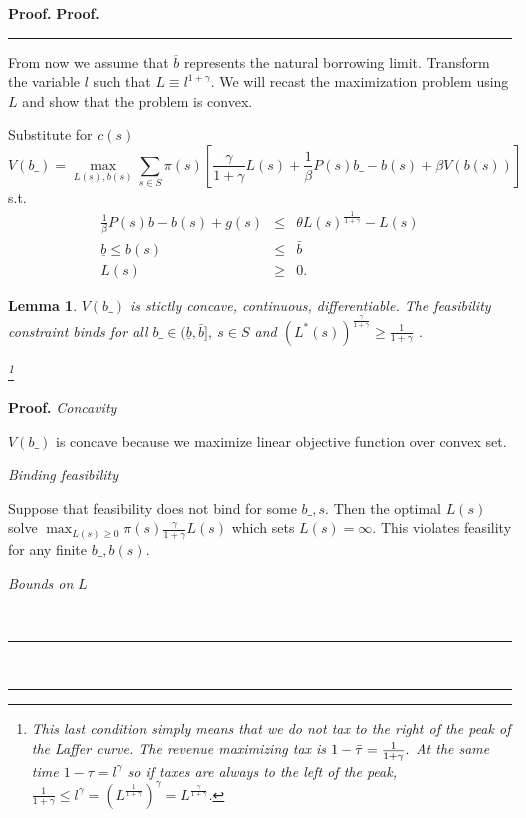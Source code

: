 \documentclass[thmsb,11pt]{article}
\newtheorem{lemma}{Lemma}
\newenvironment{proof}[1][Proof]{\noindent \textbf{#1.} }{\  \rule{0.5em}{0.5em}}
\begin{document}
\begin{proof}
\begin{proof}
\end{proof}

From now we assume that $\overline{b}$ represents the natural borrowing limit. Transform the variable $l$ such that $L\equiv l^{1+\gamma }$. We will recast the maximization problem using $L$ and show that the problem is convex.

Substitute for $c\left( s\right) $%
\[
V\left( b\_\right) =\max_{L(s),b(s)}\sum_{s\in S}\pi \left(
s\right) \left[ \frac{\gamma}{1+\gamma }L\left( s\right) +\frac{1}{\beta }%
P\left( s\right) b\_-b\left( s\right) +\beta V\left( b\left( s\right)
\right) \right]
\]%
s.t.%
\begin{eqnarray*}
\frac{1}{\beta }P\left( s\right) b-b\left( s\right) +g\left( s\right) &\leq
&\theta L\left( s\right)^{\frac{1}{1+\gamma} } -L\left( s\right) \\
\underline{b}\leq b\left( s\right) &\leq &\bar{b} \\
L\left( s\right) &\geq &0.
\end{eqnarray*}

\begin{lemma}
\smallskip $V\left( b\_\right) $ is stictly concave, continuous,
differentiable. The feasibility constraint binds for all $b\_\in (\underline{b} ,\bar{b}%
],\ s\in S$ and $\left( L^{\ast }\left( s\right) \right) ^{\frac{\gamma}{1+\gamma} }\geq\frac{1}{1+\gamma}$ .

\footnote{
This last condition simply means that we do not tax to the right of the peak
of the Laffer curve. The revenue maximizing tax is $1-\bar{\tau}=\frac{1}{%
1+\gamma }.$ At the same time $1-\tau =l^{\gamma}$ so if taxes are always
to the left of the peak, $\frac{1}{1+\gamma }\leq l^{\gamma }=\left(
L^{\frac{1}{1+\gamma} }\right)^{\gamma}=L^{\frac{\gamma}{1+\gamma} }$.}
\end{lemma}

\begin{proof}
\smallskip \textit{Concavity}

$V\left( b\_\right) $ is concave because we maximize linear objective
function over convex set.

\textit{Binding feasibility}

Suppose that feasibility does not bind for some $b\_,s.$ Then the optimal $%
L\left( s\right) $ solve $\max_{L\left( s\right) \geq 0}\pi \left( s\right)
\frac{\gamma}{1+\gamma }L\left( s\right) $ which sets $L\left( s\right)
=\infty .$ This violates feasility for any finite $b\_,b\left( s\right) .$

\textit{Bounds on }$L$


\end{proof}
\end{proof}
\end{document}
